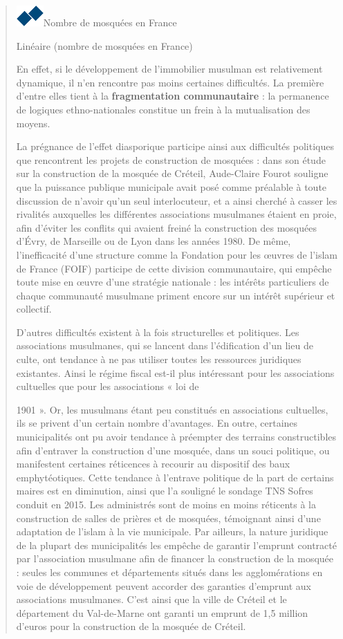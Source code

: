 \begin{quote}
\includegraphics{ImageIslamFrance/media/image9.png}Nombre de mosquées en France

Linéaire (nombre de mosquées en France)

En effet, si le développement de l'immobilier musulman est relativement
dynamique, il n'en rencontre pas moins certaines difficultés. La
première d'entre elles tient à la \textbf{fragmentation communautaire} :
la permanence de logiques ethno-nationales constitue un frein à la
mutualisation des moyens.

La prégnance de l'effet diasporique participe ainsi aux difficultés
politiques que rencontrent les projets de construction de mosquées :
dans son étude sur la construction de la mosquée de Créteil, Aude-Claire
Fourot souligne que la puissance publique municipale avait posé comme
préalable à toute discussion de n'avoir qu'un seul interlocuteur, et a
ainsi cherché à casser les rivalités auxquelles les différentes
associations musulmanes étaient en proie, afin d'éviter les conflits qui
avaient freiné la construction des mosquées d'Évry, de Marseille ou de
Lyon dans les années 1980. De même, l'inefficacité d'une structure comme
la Fondation pour les œuvres de l'islam de France (FOIF) participe de
cette division communautaire, qui empêche toute mise en œuvre d'une
stratégie nationale : les intérêts particuliers de chaque communauté
musulmane priment encore sur un intérêt supérieur et collectif.

D'autres difficultés existent à la fois structurelles et politiques. Les
associations musulmanes, qui se lancent dans l'édification d'un lieu de
culte, ont tendance à ne pas utiliser toutes les ressources juridiques
existantes. Ainsi le régime fiscal est-il plus intéressant pour les
associations cultuelles que pour les associations « loi de



1901 ». Or, les musulmans étant peu constitués en associations
cultuelles, ils se privent d'un certain nombre d'avantages. En outre,
certaines municipalités ont pu avoir tendance à préempter des terrains
constructibles afin d'entraver la construction d'une mosquée, dans un
souci politique, ou manifestent certaines réticences à recourir au
dispositif des baux emphytéotiques. Cette tendance à l'entrave politique
de la part de certains maires est en diminution, ainsi que l'a souligné
le sondage TNS Sofres conduit en 2015. Les administrés sont de moins en
moins réticents à la construction de salles de prières et de mosquées,
témoignant ainsi d'une adaptation de l'islam à la vie municipale. Par
ailleurs, la nature juridique de la plupart des municipalités les
empêche de garantir l'emprunt contracté par l'association musulmane afin
de financer la construction de la mosquée : seules les communes et
départements situés dans les agglomérations en voie de développement
peuvent accorder des garanties d'emprunt aux associations musulmanes.
C'est ainsi que la ville de Créteil et le département du Val-de-Marne
ont garanti un emprunt de 1,5 million d'euros pour la construction de la
mosquée de Créteil.


\end{quote}
